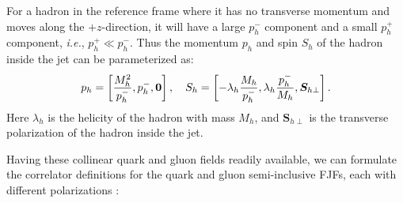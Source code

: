 \documentclass[a4paper, 11 pt]{article}
\begin{document}
For a hadron in the reference frame where it has no transverse momentum and moves along the $+z$-direction, it will have a large $p_h^-$ component and a small $p_h^+$ component, \textit{i.e.}, $p_h^+ \ll p_h^-$.
Thus the momentum $p_h$ and spin $S_h$ of the hadron inside the jet can be parameterized as:
\begin{align}
p_h = \bqty{\frac{M_h^2}{p_h^-}, p_h^-, \boldsymbol{0}}
\, ,
\quad
S_h = \bqty{- \lambda_h \frac{M_h}{p_h^-}, \lambda_h \frac{p_h^-}{M_h}, \boldsymbol{S}_{h\perp}}
\, .
\end{align}
Here $\lambda_h$ is the helicity of the hadron with mass $M_h$, and $\boldsymbol{S}_{h\perp}$ is the transverse polarization of the hadron inside the jet.

Having these collinear quark and gluon fields readily available, we can formulate the correlator definitions for the quark and gluon semi-inclusive FJFs, each with different polarizations \cite{Procura:2009vm, Jain:2011iu, Kang:2016mcy, Kang:2016ehg}:
\begingroup
\allowdisplaybreaks
\end{document}
